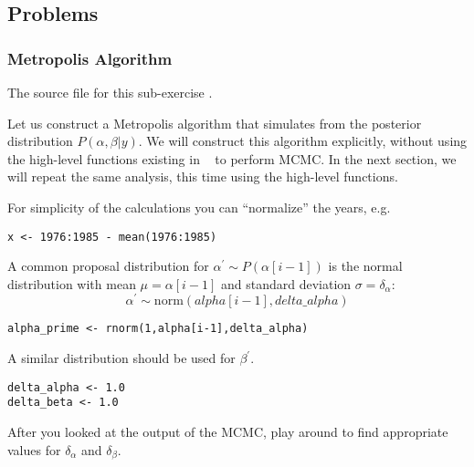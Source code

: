 \subsection{Problems}

\subsubsection{Metropolis Algorithm}%

The source file for this sub-exercise .

Let us construct a Metropolis algorithm that simulates from the posterior distribution $P(\alpha,\beta|y)$. 
We will construct this algorithm explicitly, without using the high-level functions existing in \RevBayes~ to perform MCMC. 
In the next section, we will repeat the same analysis, this time using the high-level functions.
 
For simplicity of the calculations you can ``normalize'' the years, e.g. 
{\tt \begin{snugshade*}
\begin{lstlisting}    
x <- 1976:1985 - mean(1976:1985)
\end{lstlisting}
\end{snugshade*}}

A common proposal distribution for $\alpha^{\prime} \sim P(\alpha[i-1])$ is the normal distribution with mean $\mu = \alpha[i-1]$ and standard deviation $\sigma = \delta_\alpha$:
\begin{equation}
\alpha^{\prime} \sim \text{norm}(alpha[i-1],delta\_alpha)
\end{equation}

{\tt \begin{snugshade*}
\begin{lstlisting}    
alpha_prime <- rnorm(1,alpha[i-1],delta_alpha)
\end{lstlisting}
\end{snugshade*}}
A similar distribution should be used for $\beta^{\prime}$. 
{\tt \begin{snugshade*}
\begin{lstlisting}    
delta_alpha <- 1.0
delta_beta <- 1.0
\end{lstlisting}
\end{snugshade*}}
After you looked at the output of the MCMC, play around to find appropriate values for $\delta_{\alpha}$ and $\delta_{\beta}$.


